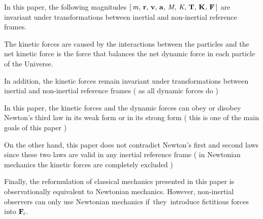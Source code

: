 \documentclass[10pt]{article}
\begin{document}
\par \bigskip \noindent In this paper, the following magnitudes $[ \, {\mathit{m}},\, {\mathbf{r}},\, {\mathbf{v}},\, {\mathbf{a}},\, {\mathit{M}}\hspace{-0.09em},\, {\mathit{K}}\hspace{-0.09em},\, {\mathbf{T}},\, {\mathbf{K}},\, {\mathbf{F}} \, ]$ are invariant under transformations between inertial and non-inertial reference frames.

\par \bigskip \noindent The kinetic forces are caused by the interactions between the particles and the net kinetic force is the force that balances the net dynamic force in each particle of the Universe.

\par \bigskip \noindent In addition, the kinetic forces remain invariant under transformations between inertial and non-inertial reference frames ( as all dynamic forces do )

\par \bigskip \noindent In this paper, the kinetic forces and the dynamic forces can obey or disobey Newton's third law in its weak form or in its strong form ( this is one of the main goals of this paper )

\par \bigskip \noindent On the other hand, this paper does not contradict Newton's first and second laws since these two laws are valid in any inertial reference frame ( in Newtonian mechanics the kinetic forces are completely excluded )

\par \bigskip \noindent Finally, the reformulation of classical mechanics presented in this paper is observationally equivalent to Newtonian mechanics. However, non-inertial observers can only use Newtonian mechanics \hbox {if they introduce} fictitious forces into ${\mathbf{F}}_{\hspace{-0.09em}i}$.

\newpage

\par {}

\par {}\hypertarget{a1p1}{}
\end{document}
